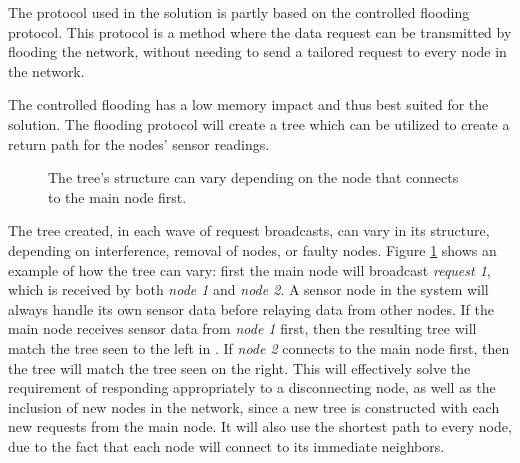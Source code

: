The protocol used in the solution is partly based on the controlled flooding protocol.
This protocol is a method where the data request can be transmitted by flooding the network, without needing to send a tailored request to every node in the network. 

The controlled flooding has a low memory impact and thus best suited for the solution. The flooding protocol will create a tree which can be utilized to create a return path for the nodes' sensor readings.

\begin{figure}[h!]
	\centering
	\caption{The tree's structure can vary depending on the node that connects to the main node first.}
	\label{fig:treeVariation}
\end{figure}

The tree created, in each wave of request broadcasts, can vary in its structure, depending on interference, removal of nodes, or faulty nodes. Figure \ref{fig:treeVariation} shows an example of how the tree can vary: first the main node will broadcast \textit{request 1}, which is received by both \textit{node 1} and \textit{node 2}. A sensor node in the system will always handle its own sensor data before relaying data from other nodes. If the main node receives sensor data from \textit{node 1} first, then the resulting tree will match the tree seen to the left in . If \textit{node 2} connects to the main node first, then the tree will match the tree seen on the right.
This will effectively solve the requirement of responding appropriately to a disconnecting node, as well as the inclusion of new nodes in the network, since a new tree is constructed with each new requests from the main node.
It will also use the shortest path to every node, due to the fact that each node will connect to its immediate neighbors.

